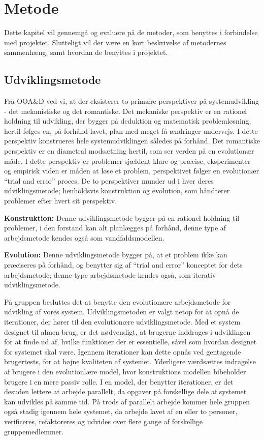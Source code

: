 \chapter{Metode}\label{chapter:Metode}

Dette kapitel vil gennemgå og evaluere på de metoder, som benyttes i forbindelse med projektet.
Slutteligt vil der være en kort beskrivelse af metodernes sammenhæng, samt hvordan de benyttes i projektet.

\section{Udviklingsmetode}\label{s:udviklingsmetode}
Fra OOA\&D ved vi, at der eksisterer to primære perspektiver på systemudvikling - det mekanistiske og det romantiske.
Det mekaniske perspektiv er en rationel holdning til udvikling, der bygger på deduktion og matematisk problemløsning, hertil følges en, på forhånd lavet, plan med meget få ændringer undervejs.
I dette perspektiv konstrueres hele systemudviklingen således på forhånd.
Det romantiske perspektiv er en diametral modsætning hertil, som ser verden på en evolutionær måde.
I dette perspektiv er problemer sjældent klare og præcise, eksperimenter og empirisk viden er måden at løse et problem, perspektivet følger en evolutionær ``trial and error'' proces.
De to perspektiver munder ud i hver deres udviklingsmetode; henholdsvis konstruktion og evolution, som håndterer problemer efter hvert sit perspektiv.\citep{OOA&D2001}

\textbf{Konstruktion:}
Denne udviklingsmetode bygger på en rationel holdning til problemer, i den forstand kan alt planlægges på forhånd, denne type af arbejdsmetode kendes også som vandfaldsmodellen.

\textbf{Evolution:}
Denne udviklingsmetode bygger på, at et problem ikke kan præciseres på forhånd, og benytter sig af ``trial and error'' konceptet for dets arbejdsmetode; denne type arbejdsmetode kendes også, som iterativ udviklingsmetode.

På gruppen besluttes det at benytte den evolutionære arbejdsmetode for udvikling af vores system. 
Udviklingsmetoden er valgt netop for at opnå de iterationer, der hører til den evolutionære udviklingsmetode. 
Med et system designet til almen brug, er det nødvendigt, at brugerne inddrages i udviklingen for at finde ud af, hvilke funktioner der er essentielle, såvel som hvordan designet for systemet skal være. 
Igennem iterationer kan dette opnås ved gentagende brugertests, for at højne kvaliteten af systemet. 
Yderligere værdsættes indragelse af brugere i den evolutionlære model, hvor konstruktions modellen bibeholder brugere i en mere passiv rolle.
I en model, der benytter iterationer, er det desuden lettere at arbejde parallelt, da opgaver på forskellige dele af systemet kan udvikles på samme tid.
På trods af parallelt arbejde kommer hele gruppen også stadig igennem hele systemet, da arbejde lavet af en eller to personer, verificeres, refaktoreres og udvides over flere gange af forskellige gruppemedlemmer.

